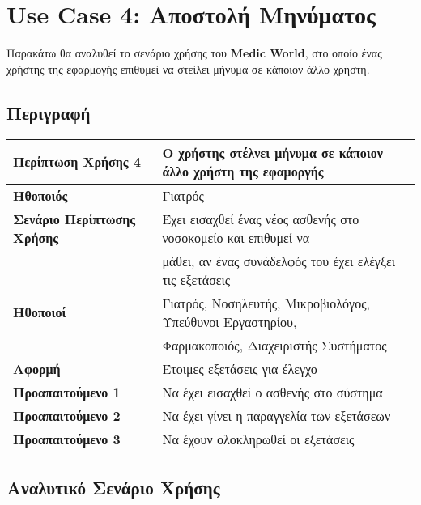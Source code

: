 \documentclass{article}
\newcommand\T{\rule{0pt}{2.6ex}}       %
\newcommand\B{\rule[-1.2ex]{0pt}{0pt}}
\begin{document}
\section{Use Case 4: Αποστολή Μηνύματος}

Παρακάτω θα αναλυθεί το σενάριο χρήσης του \textbf{Medic World}, στο οποίο ένας χρήστης της εφαρμογής επιθυμεί να στείλει μήνυμα σε κάποιον άλλο χρήστη.

\subsection{Περιγραφή}

\begin{center}
     \begin{tabular}{|l|l|}
     \hline
      \textbf{Περίπτωση Χρήσης 4} & Ο χρήστης στέλνει μήνυμα σε κάποιον άλλο χρήστη της εφαμοργής \T\B \\ 
      \hline
      \textbf{Ηθοποιός} & Γιατρός \T\B \\
      \hline
      \textbf{Σενάριο Περίπτωσης Χρήσης} & Έχει εισαχθεί ένας νέος ασθενής στο νοσοκομείο και επιθυμεί να \T \\& μάθει, αν ένας συνάδελφός του έχει ελέγξει τις εξετάσεις \B \\
      \hline
      \textbf{Ηθοποιοί} & Γιατρός, Νοσηλευτής, Μικροβιολόγος, Υπεύθυνοι Εργαστηρίου, \T \\& Φαρμακοποιός, Διαχειριστής Συστήματος \T\B \\
      \hline
      \textbf{Αφορμή} & Έτοιμες εξετάσεις για έλεγχο \T\B \\
      \hline
      \textbf{Προαπαιτούμενο 1} & Να έχει εισαχθεί ο ασθενής στο σύστημα \T\B \\
      \hline
      \textbf{Προαπαιτούμενο 2} & Να έχει γίνει η παραγγελία των εξετάσεων \T\B \\
      \hline
      \textbf{Προαπαιτούμενο 3} & Να έχουν ολοκληρωθεί οι εξετάσεις \T\B \\
      \hline
     \end{tabular}
 \end{center}
 
  \newpage
 
 \subsection{Αναλυτικό Σενάριο Χρήσης}
\end{document}
